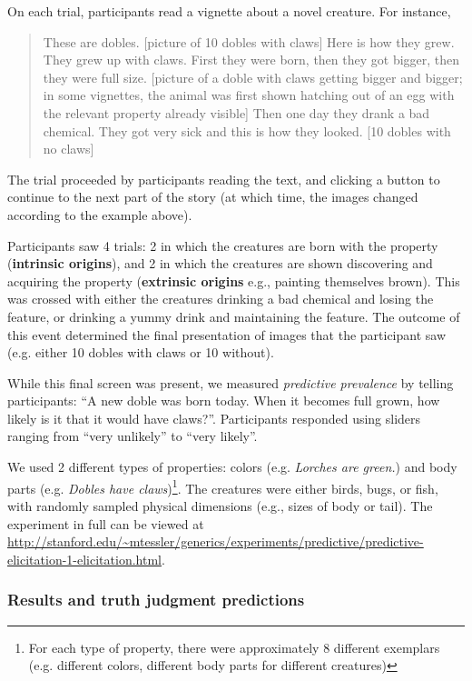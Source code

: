 \documentclass[12pt,letterpaper]{article}
\begin{document}
On each trial, participants read a vignette about a novel creature. For instance,
\begin{quote}
These are dobles. [picture of 10 dobles with claws] Here is how they grew. They grew up with claws. First they were born, then they got bigger, then they were full size. [picture of a doble with claws getting bigger and bigger; in some vignettes, the animal was first shown hatching out of an egg with the relevant property already visible] Then one day they drank a bad chemical. They got very sick and this is how they looked. [10 dobles with no claws]
\end{quote}
The trial proceeded by participants reading the text, and clicking a button to continue to the next part of the story (at which time, the images changed according to the example above).

Participants saw 4 trials: 2 in which the creatures are born with the property (\textbf{intrinsic origins}), and 2 in which the creatures are shown discovering and acquiring the property (\textbf{extrinsic origins} e.g., painting themselves brown).
This was crossed with either the creatures drinking a bad chemical and losing the feature, or drinking a yummy drink and maintaining the feature.
The outcome of this event determined the final presentation of images that the participant saw (e.g. either 10 dobles with claws or 10 without).

While this final screen was present, we measured \emph{predictive prevalence} by telling participants: ``A new doble was born today. When it becomes full grown, how likely is it that it would have claws?''.
Participants responded using sliders ranging from ``very unlikely'' to ``very likely''.

We used 2 different types of properties: colors (e.g. \emph{Lorches are green.}) and body parts (e.g. \emph{Dobles have claws})\footnote{
For each type of property, there were approximately 8 different exemplars (e.g. different colors, different body parts for different creatures)}.
The creatures were either birds, bugs, or fish, with randomly sampled physical dimensions (e.g., sizes of body or tail).
The experiment in full can be viewed at \url{http://stanford.edu/~mtessler/generics/experiments/predictive/predictive-elicitation-1-elicitation.html}.


\subsubsection*{Results and truth judgment predictions}
\end{document}
